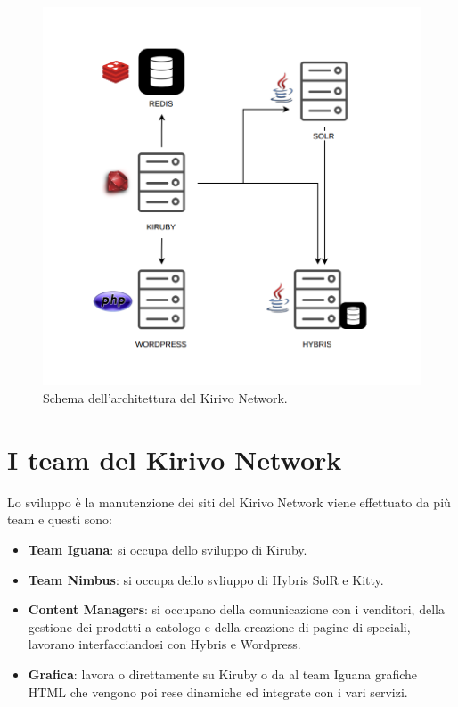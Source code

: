 \begin{figure}
  \includegraphics[width=\textwidth]{figure/arch.png}
  \caption{Schema dell'architettura del Kirivo Network.}
  \label{fig:kn}
\end{figure}


\newpage

\section{I team del Kirivo Network}
Lo sviluppo è la manutenzione dei siti del Kirivo Network viene effettuato da più team e questi sono:
\begin{itemize}
\item {\bf Team Iguana}: si occupa dello sviluppo di Kiruby.
\item {\bf Team Nimbus}: si occupa dello svliuppo di Hybris SolR e Kitty.
\item {\bf Content Managers}: si occupano della comunicazione con i venditori, della gestione dei prodotti a catologo
 e della creazione di pagine di speciali, lavorano interfacciandosi con Hybris e Wordpress.
\item {\bf Grafica}: lavora o direttamente su Kiruby o da al team Iguana grafiche HTML che vengono poi rese dinamiche 
ed integrate con i vari servizi.
\end{itemize}

